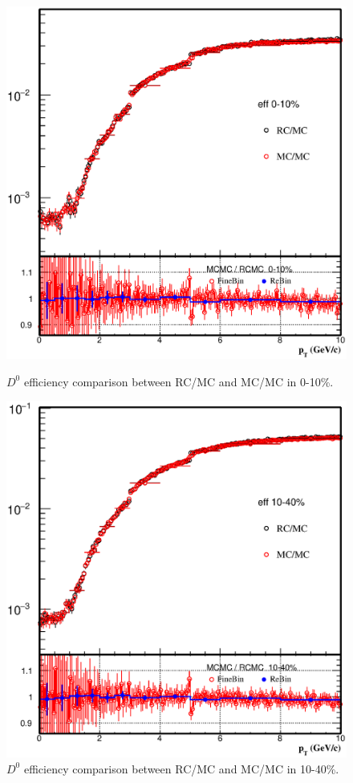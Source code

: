 \begin{figure}[htbp]
\begin{minipage}[htbp]{0.52\linewidth}
\centering
\includegraphics[width=1.0\textwidth]{figure/Run14_D0HFT/D0_eff_forMCRC_0_10.eps}
\caption{$D^{0}$ efficiency comparison between RC/MC and MC/MC in 0-10\%. \label{fig:D0_eff_forMCRC_0_10}}
\end{minipage}
\hfill
\begin{minipage}[htbp]{0.52\linewidth}
\centering
\includegraphics[width=1.0\textwidth]{figure/Run14_D0HFT/D0_eff_forMCRC_10_40.eps} 
\caption{$D^{0}$ efficiency comparison between RC/MC and MC/MC in 10-40\%. \label{fig:D0_eff_forMCRC_10_40}}
\end{minipage}
\end{figure}

